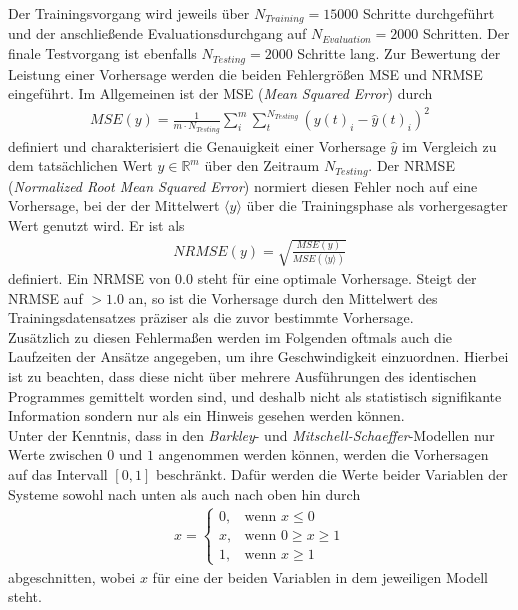 Der Trainingsvorgang wird jeweils über $N_{Training}=15000$ Schritte durchgeführt und der anschließende Evaluationsdurchgang auf $N_{Evaluation} = 2000$ Schritten. Der finale Testvorgang ist ebenfalls $N_{Testing}=2000$ Schritte lang.
Zur Bewertung der Leistung einer Vorhersage werden die beiden Fehlergrößen MSE und NRMSE eingeführt. Im Allgemeinen ist der MSE (\textit{Mean Squared Error}) durch
\begin{align}
MSE(y) = \frac{1}{m \cdot N_{Testing}} \sum_i^m \sum_t^{N_{Testing}} \left(y(t)_i - \hat{y}(t)_i \right)^2
\end{align}
definiert und charakterisiert die Genauigkeit einer Vorhersage $\hat{y}$ im Vergleich zu dem tatsächlichen Wert $y \in \mathbb{R}^m$ über den Zeitraum $N_{Testing}$. Der NRMSE (\textit{Normalized Root Mean Squared Error}) normiert diesen Fehler noch auf eine Vorhersage, bei der der Mittelwert $\langle y \rangle$ über die Trainingsphase als vorhergesagter Wert genutzt wird. Er ist als
\begin{align}
NRMSE(y) = \sqrt{\frac{MSE(y)}{MSE\left(\langle y \rangle\right)}}
\end{align}
definiert. Ein NRMSE von $0.0$ steht für eine optimale Vorhersage. Steigt der NRMSE auf $>1.0$ an, so ist die Vorhersage durch den Mittelwert des Trainingsdatensatzes präziser als die zuvor bestimmte Vorhersage.\\
Zusätzlich zu diesen Fehlermaßen werden im Folgenden oftmals auch die Laufzeiten der Ansätze angegeben, um ihre Geschwindigkeit einzuordnen. Hierbei ist zu beachten, dass diese nicht über mehrere Ausführungen des identischen Programmes gemittelt worden sind, und deshalb nicht als statistisch signifikante Information sondern nur als ein Hinweis gesehen werden können.\\

Unter der Kenntnis, dass in den \textit{Barkley}- und \textit{Mitschell-Schaeffer}-Modellen nur Werte zwischen $0$ und $1$ angenommen werden können, werden die Vorhersagen auf das Intervall $[0, 1]$ beschränkt. Dafür werden die Werte beider Variablen der Systeme sowohl nach unten als auch nach oben hin durch 
\begin{align}
x = \begin{cases}
	0,& \text{wenn } x \leq 0\\
	x,& \text{wenn } 0 \geq x \geq1\\
    1,& \text{wenn } x \geq 1
\end{cases}
\end{align}
abgeschnitten, wobei $x$ für eine der beiden Variablen in dem jeweiligen Modell steht.\\

